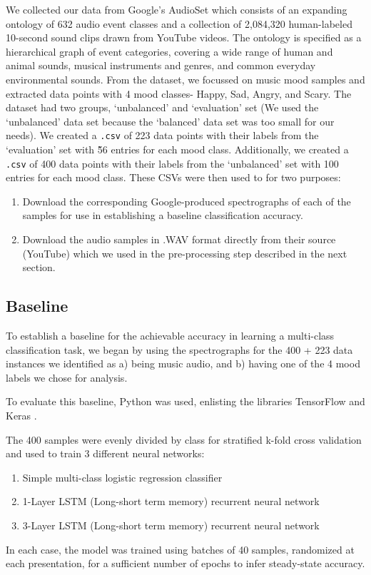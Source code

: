 \documentclass{article}
\begin{document}
We collected our data from Google’s AudioSet \cite{audioset} which consists of an expanding ontology of 632 audio event classes and a collection of 2,084,320 human-labeled 10-second sound clips drawn from YouTube videos. The ontology is specified as a hierarchical graph of event categories, covering a wide range of human and animal sounds, musical instruments and genres, and common everyday environmental sounds. From the dataset, we focussed on music mood samples and extracted data points with 4 mood classes- Happy, Sad, Angry, and Scary. The dataset had two groups, `unbalanced' and `evaluation' set (We used the `unbalanced' data set because the `balanced' data set was too small for our needs). We created a \texttt{.csv} of 223 data points with their labels from the `evaluation' set with \~56 entries for each mood class. Additionally, we created a \texttt{.csv} of 400 data points with their labels from the `unbalanced' set with 100 entries for each mood class. These CSVs were then used to for two purposes:
\begin{enumerate}
\item Download the corresponding Google-produced spectrographs of each of the samples for use in establishing a baseline classification accuracy.
\item Download the audio samples in .WAV format directly from their source (YouTube) which we used in the pre-processing step described in the next section.
\end{enumerate}


\subsection{Baseline}

To establish a baseline for the achievable accuracy in learning a  multi-class classification task, we began by using the spectrographs for the 400 + 223 data instances we identified as a) being music audio, and b) having one of the 4 mood labels we chose for analysis.

To evaluate this baseline, Python was used, enlisting the libraries TensorFlow \cite{tensorflow} and Keras \cite{keras}.

The 400 samples were evenly divided by class for stratified k-fold cross validation and used to train 3 different neural networks:
\begin{enumerate}
\item Simple multi-class logistic regression classifier
\item 1-Layer LSTM (Long-short term memory) recurrent neural network
\item 3-Layer LSTM (Long-short term memory) recurrent neural network
\end{enumerate}
In each case, the model was trained using batches of 40 samples, randomized at each presentation, for a sufficient number of epochs to infer steady-state accuracy.
\end{document}
